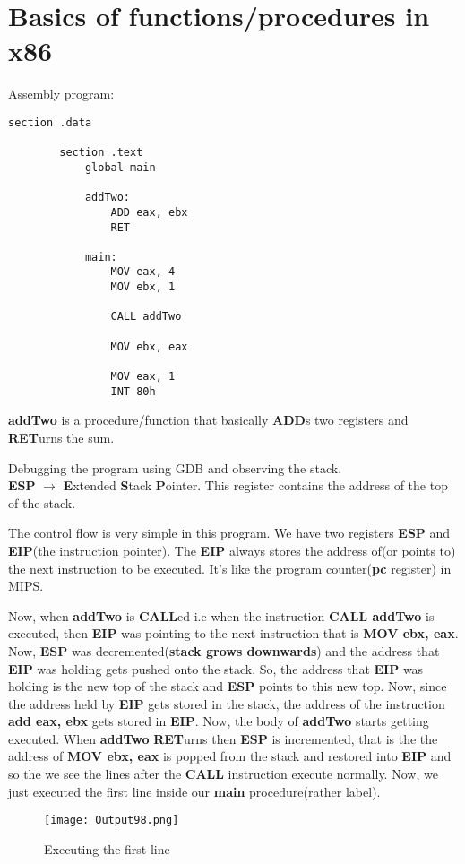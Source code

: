 \documentclass{article}
\makeatletter
\renewcommand\paragraph{\@startsection{paragraph}{4}{\z@}{-3.25ex \@plus -1ex \@minus -.2ex}{1.5ex \@plus .2ex}{\normalfont\normalsize\bfseries}}
\makeatother
\begin{document}
	\section{Basics of functions/procedures in x86}\label{sec:sec1}
	\paragraph{}
	Assembly program:
	\begin{lstlisting}[frame=single, breaklines=true]
		section .data
		
		section .text
			global main
			
			addTwo:
				ADD eax, ebx
				RET
			
			main:
				MOV eax, 4
				MOV ebx, 1
				
				CALL addTwo
				
				MOV ebx, eax
				
				MOV eax, 1
				INT 80h
	\end{lstlisting}
\textbf{addTwo} is a procedure/function that basically \textbf{ADD}s two registers and \textbf{RET}urns the sum.

\vspace{10pt}
Debugging the program using GDB and observing the stack. \\
\textbf{ESP} $\rightarrow$ \textbf{E}xtended \textbf{S}tack \textbf{P}ointer. This register contains the address of the top of the stack.

The control flow is very simple in this program. We have two registers \textbf{ESP} and \textbf{EIP}(the instruction pointer). The \textbf{EIP} always stores the address of(or points to) the next instruction to be executed. It's like the program counter(\textbf{pc} register) in MIPS.

\vspace{10pt}
Now, when \textbf{addTwo} is \textbf{CALL}ed i.e when the instruction \textbf{CALL addTwo} is executed, then \textbf{EIP} was pointing to the next instruction that is \textbf{MOV ebx, eax}. Now, \textbf{ESP} was decremented(\textbf{stack grows downwards}) and the address that \textbf{EIP} was holding gets pushed onto the stack. So, the address that \textbf{EIP} was holding is the new top of the stack and \textbf{ESP} points to this new top. Now, since the address held by \textbf{EIP} gets stored in the stack, the address of the instruction \textbf{add eax, ebx} gets stored in \textbf{EIP}. Now, the body of \textbf{addTwo} starts getting executed. When \textbf{addTwo} \textbf{RET}urns then \textbf{ESP} is incremented, that is the the address of \textbf{MOV ebx, eax} is popped from the stack and restored into \textbf{EIP} and so the we see the lines after the \textbf{CALL} instruction execute normally.
\newpage
Now, we just executed the first line inside our \textbf{main} procedure(rather label).
\begin{figure}[h]
	\centering
	\texttt{[image: Output98.png]}
	\caption{Executing the first line}
	\label{fig:fig1}
\end{figure}
\end{document}
